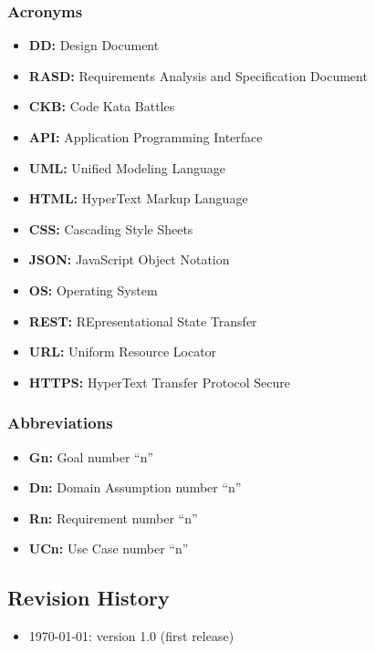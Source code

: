 \subsubsection{Acronyms}
\begin{itemize}
    \item {\textbf{DD:} Design Document}
    \item {\textbf{RASD:} Requirements Analysis and Specification Document}
    \item {\textbf{CKB:} Code Kata Battles}
    \item {\textbf{API:} Application Programming Interface}
    \item {\textbf{UML:} Unified Modeling Language}
    \item {\textbf{HTML:} HyperText Markup Language}
    \item {\textbf{CSS:} Cascading Style Sheets}
    \item {\textbf{JSON:} JavaScript Object Notation}
    \item {\textbf{OS:} Operating System}
    \item {\textbf{REST:} REpresentational State Transfer}
    \item {\textbf{URL:} Uniform Resource Locator}
    \item {\textbf{HTTPS:} HyperText Transfer Protocol Secure}
\end{itemize}
\subsubsection{Abbreviations}
\begin{itemize}
    \item {\textbf{Gn:} Goal number “n”}
    \item {\textbf{Dn:} Domain Assumption number “n”}
    \item {\textbf{Rn:} Requirement number “n”}
    \item {\textbf{UCn:} Use Case number “n”}
\end{itemize}

\subsection{Revision History}
\begin{itemize}
    \item \today: version 1.0 (first release)
\end{itemize}

